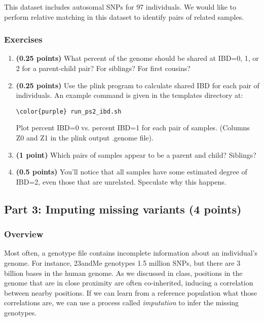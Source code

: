 \documentclass[12pt]{article}
\begin{document}
This dataset includes autosomal SNPs for 97 individuals. We would like to perform relative matching in this dataset to identify pairs of related samples.

\subsubsection*{Exercises}
\begin{enumerate}
\item \textbf{(0.25 points)} What percent of the genome should be shared at IBD=0, 1, or 2 for a parent-child pair? For siblings? For first cousins?

\item \textbf{(0.25 points)} Use the plink program to calculate shared IBD for each pair of individuals. An example command is given in the templates directory at:
\begin{Verbatim}[commandchars=\\\{\}]
\color{purple} run_ps2_ibd.sh
\end{Verbatim}

Plot percent IBD=0 vs. percent IBD=1 for each pair of samples. (Columns Z0 and Z1 in the plink output .genome file).

\item \textbf{(1 point)}  Which pairs of samples appear to be a parent and child? Siblings? 

\item \textbf{(0.5 points)} You'll notice that all samples have some estimated degree of IBD=2, even those that are unrelated. Speculate why this happens.

\end{enumerate}

\subsection*{Part 3: Imputing missing variants (4 points)}

\subsubsection*{Overview}

Most often, a genotype file contains incomplete information about an individual's genome. For instance, 23andMe genotypes 1.5 million SNPs, but there are 3 billion bases in the human genome. As we discussed in class, positions in the genome that are in close proximity are often co-inherited, inducing a correlation between nearby positions. If we can learn from a reference population what those correlations are, we can use a process called \emph{imputation} to infer the missing genotypes.
\end{document}
